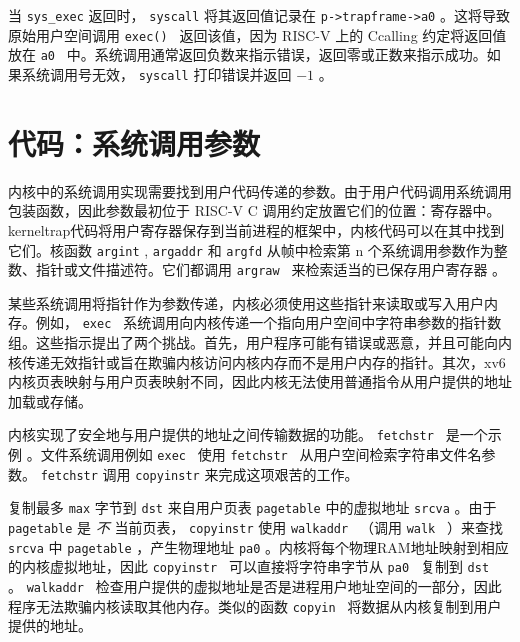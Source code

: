 当    \lstinline{sys_exec}    返回时，
    \lstinline{syscall}   将其返回值记录在
    \lstinline{p->trapframe->a0}    。这将导致原始用户空间调用
  {    \tt    exec()   }  返回该值，因为 RISC-V 上的 Ccalling 约定将返回值放在  {    \tt    a0   }  中。系统调用通常返回负数来指示错误，返回零或正数来指示成功。如果系统调用号无效，
    \lstinline{syscall}    打印错误并返回    $-1$    。  

   \section{代码：系统调用参数  }     

内核中的系统调用实现需要找到用户代码传递的参数。由于用户代码调用系统调用包装函数，因此参数最初位于 RISC-V C 调用约定放置它们的位置：寄存器中。kerneltrap代码将用户寄存器保存到当前进程的框架中，内核代码可以在其中找到它们。核函数
    \lstinline{argint}    ,
    \lstinline{argaddr}    和
    \lstinline{argfd}    从帧中检索第 n 个系统调用参数作为整数、指针或文件描述符。它们都调用  {    \tt    argraw   }  来检索适当的已保存用户寄存器
        。  

某些系统调用将指针作为参数传递，内核必须使用这些指针来读取或写入用户内存。例如， {    \tt    exec   }  系统调用向内核传递一个指向用户空间中字符串参数的指针数组。这些指示提出了两个挑战。首先，用户程序可能有错误或恶意，并且可能向内核传递无效指针或旨在欺骗内核访问内核内存而不是用户内存的指针。其次，xv6 内核页表映射与用户页表映射不同，因此内核无法使用普通指令从用户提供的地址加载或存储。  

内核实现了安全地与用户提供的地址之间传输数据的功能。
  {    \tt    fetchstr   }  是一个示例         。文件系统调用例如
  {    \tt    exec   }  使用  {    \tt    fetchstr   }  从用户空间检索字符串文件名参数。
    \lstinline{fetchstr}    调用    \lstinline{copyinstr}    来完成这项艰苦的工作。  

        复制最多    \lstinline{max}    字节到
    \lstinline{dst}    来自用户页表    \lstinline{pagetable}    中的虚拟地址    \lstinline{srcva}    。由于    \lstinline{pagetable}    是  {    \it    不   }  当前页表，
    \lstinline{copyinstr}    使用  {    \tt    walkaddr   }  （调用  {    \tt    walk   }  ）来查找
    \lstinline{srcva}    中
    \lstinline{pagetable}    ，产生物理地址    \lstinline{pa0}    。内核将每个物理RAM地址映射到相应的内核虚拟地址，因此
  {    \tt    copyinstr   }   可以直接将字符串字节从  {    \tt    pa0   }  复制到  {    \tt    dst   }  。
  {    \tt    walkaddr   } 
      检查用户提供的虚拟地址是否是进程用户地址空间的一部分，因此程序无法欺骗内核读取其他内存。类似的函数  {    \tt    copyin   }  将数据从内核复制到用户提供的地址。  

